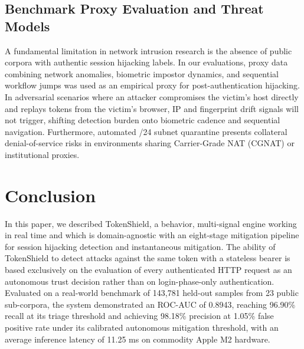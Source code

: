 \documentclass[conference]{IEEEtran}
\begin{document}
\subsection{Benchmark Proxy Evaluation and Threat Models}
A fundamental limitation in network intrusion research is the absence of public corpora with authentic session hijacking labels. In our evaluations, proxy data combining network anomalies, biometric impostor dynamics, and sequential workflow jumps was used as an empirical proxy for post-authentication hijacking. In adversarial scenarios where an attacker compromises the victim's host directly and replays tokens from the victim's browser, IP and fingerprint drift signals will not trigger, shifting detection burden onto biometric cadence and sequential navigation. Furthermore, automated /24 subnet quarantine presents collateral denial-of-service risks in environments sharing Carrier-Grade NAT (CGNAT) or institutional proxies.

\section{Conclusion}
In this paper, we described TokenShield, a behavior, multi-signal engine working in real time and which is domain-agnostic with an eight-stage mitigation pipeline for session hijacking detection and instantaneous mitigation. The ability of TokenShield to detect attacks against the same token with a stateless bearer is based exclusively on the evaluation of every authenticated HTTP request as an autonomous trust decision rather than on login-phase-only authentication. Evaluated on a real-world benchmark of 143,781 held-out samples from 23 public sub-corpora, the system demonstrated an ROC-AUC of 0.8943, reaching 96.90\% recall at its triage threshold and achieving 98.18\% precision at 1.05\% false positive rate under its calibrated autonomous mitigation threshold, with an average inference latency of 11.25 ms on commodity Apple M2 hardware.
\end{document}
